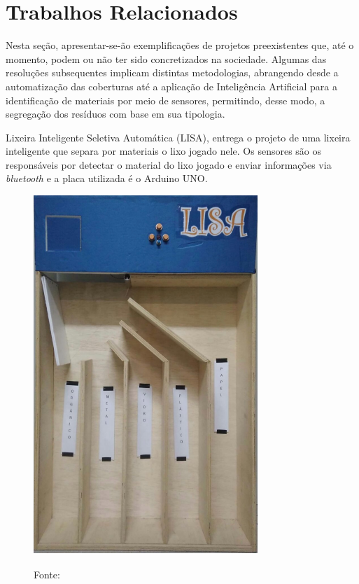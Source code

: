 \section{Trabalhos Relacionados} \label{sec:trabrel}
Nesta seção, apresentar-se-ão exemplificações de projetos preexistentes que, até o momento, podem ou não ter sido concretizados na sociedade. Algumas das resoluções subsequentes implicam distintas metodologias, abrangendo desde a automatização das coberturas até a aplicação de Inteligência Artificial para a identificação de materiais por meio de sensores, permitindo, desse modo, a segregação dos resíduos com base em sua tipologia.


\cite{lisa} Lixeira Inteligente Seletiva Automática (LISA), entrega o projeto de uma lixeira inteligente que separa por materiais o lixo jogado nele. Os sensores são os responsáveis por detectar o material do lixo jogado e enviar informações via \textit{bluetooth} e a placa utilizada é o Arduino UNO.

 \begin{figure}[H]
    
    \label{fig:lisa}
    \begin{center}
        
        \includegraphics[scale=0.5]{Textuais/imagens/lisa.png}
        
        Fonte: \cite{lisa}
    \end{center}
\end{figure}

